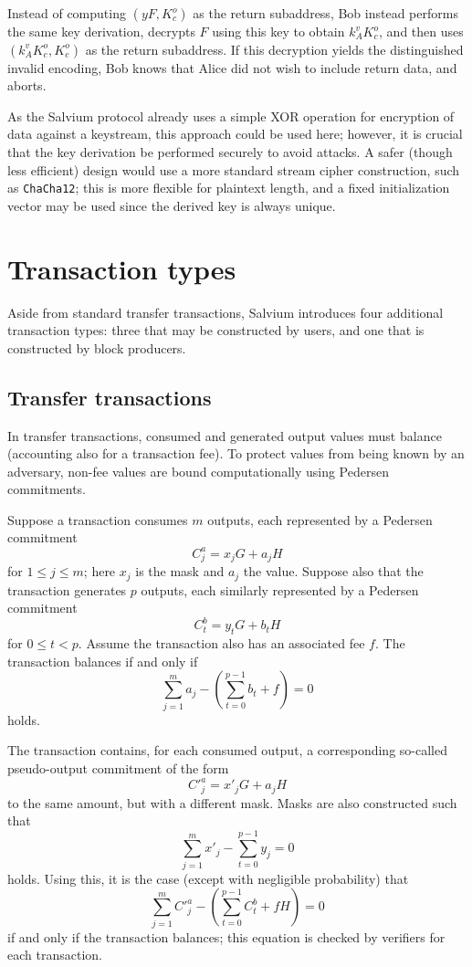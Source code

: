 \documentclass{article}
\begin{document}
Instead of computing $(y F, K_c^o)$ as the return subaddress, Bob instead performs the same key derivation, decrypts $F$ using this key to obtain $k_A^v K_c^o$, and then uses $(k_A^v K_c^o, K_c^o)$ as the return subaddress.
If this decryption yields the distinguished invalid encoding, Bob knows that Alice did not wish to include return data, and aborts.

As the Salvium protocol already uses a simple XOR operation for encryption of data against a keystream, this approach could be used here; however, it is crucial that the key derivation be performed securely to avoid attacks.
A safer (though less efficient) design would use a more standard stream cipher construction, such as \texttt{ChaCha12}; this is more flexible for plaintext length, and a fixed initialization vector may be used since the derived key is always unique.


\section{Transaction types}

Aside from standard transfer transactions, Salvium introduces four additional transaction types: three that may be constructed by users, and one that is constructed by block producers.


\subsection{Transfer transactions}

In transfer transactions, consumed and generated output values must balance (accounting also for a transaction fee).
To protect values from being known by an adversary, non-fee values are bound computationally using Pedersen commitments.

Suppose a transaction consumes $m$ outputs, each represented by a Pedersen commitment
$$C_j^a = x_j G + a_j H$$
for $1 \leq j \leq m$; here $x_j$ is the mask and $a_j$ the value.
Suppose also that the transaction generates $p$ outputs, each similarly represented by a Pedersen commitment
$$C_t^b = y_t G + b_t H$$
for $0 \leq t < p$.
Assume the transaction also has an associated fee $f$.
The transaction balances if and only if
$$\sum_{j=1}^m a_j - \left( \sum_{t=0}^{p-1} b_t + f \right) = 0$$
holds.

The transaction contains, for each consumed output, a corresponding so-called pseudo-output commitment of the form
$${C'}_j^a = x'_j G + a_j H$$
to the same amount, but with a different mask.
Masks are also constructed such that
$$\sum_{j=1}^m x'_j - \sum_{t=0}^{p-1} y_j = 0$$
holds.
Using this, it is the case (except with negligible probability) that
\begin{equation}
	\label{eqn:balance}
	\sum_{j=1}^m {C'}_j^a - \left( \sum_{t=0}^{p-1} C_t^b + f H \right) = 0
\end{equation}
if and only if the transaction balances; this equation is checked by verifiers for each transaction.
\end{document}
